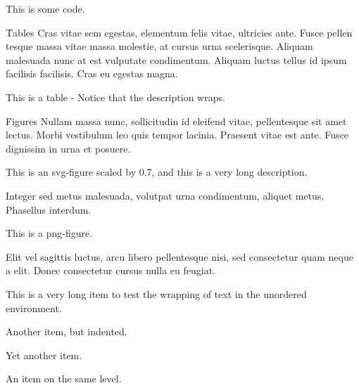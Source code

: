 \documentclass{ieee}
\begin{document}
    {This is some code.}

\h{Tables}
Cras vitae sem egestas, elementum felis vitae, ultricies ante. Fusce pellen tesque massa vitae massa molestie, at cursus urna scelerisque. Aliquam malesuada nunc at est vulputate condimentum. Aliquam luctus tellus id ipsum facilisis facilisis. Cras eu egestas magna.

    {This is a table - Notice that the description wraps.}

\h{Figures}
Nullam massa nunc, sollicitudin id eleifend vitae, pellentesque sit amet lectus. Morbi vestibulum leo quis tempor lacinia. Praesent vitae est ante. Fusce dignissim in urna et posuere.

    {This is an svg-figure scaled by 0.7, and this is a very long description.}

Integer sed metus malesuada, volutpat urna condimentum, aliquet metus. Phasellus interdum.

    {This is a png-figure.}

 Elit vel sagittis luctus, arcu libero pellentesque nisi, sed consectetur quam neque a elit. Donec consectetur cursus nulla eu feugiat.

    \begin{bullets}
        \item This is a very long item to test the wrapping of text in the unordered environment.
        \begin{bullets}
            \item Another item, but indented.
            \begin{bullets}
                \item Yet another item.
                \item An item on the same level.
            \end{bullets}
        \end{bullets}
    \end{bullets}
\end{document}
